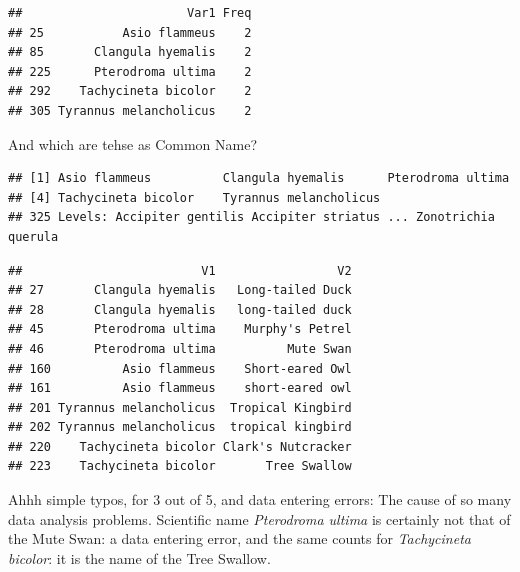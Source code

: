 \documentclass[]{book}
\newenvironment{Shaded}{\begin{snugshade}}{\end{snugshade}}
\newcommand{\DecValTok}[1]{\textcolor[rgb]{0.00,0.00,0.81}{#1}}
\newcommand{\NormalTok}[1]{#1}
\newcommand{\OperatorTok}[1]{\textcolor[rgb]{0.81,0.36,0.00}{\textbf{#1}}}
\newcommand{\StringTok}[1]{\textcolor[rgb]{0.31,0.60,0.02}{#1}}
\begin{document}
\begin{verbatim}
##                       Var1 Freq
## 25           Asio flammeus    2
## 85       Clangula hyemalis    2
## 225      Pterodroma ultima    2
## 292    Tachycineta bicolor    2
## 305 Tyrannus melancholicus    2
\end{verbatim}

And which are tehse as Common Name?

\begin{Shaded}
\end{Shaded}

\begin{verbatim}
## [1] Asio flammeus          Clangula hyemalis      Pterodroma ultima     
## [4] Tachycineta bicolor    Tyrannus melancholicus
## 325 Levels: Accipiter gentilis Accipiter striatus ... Zonotrichia querula
\end{verbatim}

\begin{Shaded}
\end{Shaded}

\begin{verbatim}
##                         V1                 V2
## 27       Clangula hyemalis   Long-tailed Duck
## 28       Clangula hyemalis   long-tailed duck
## 45       Pterodroma ultima    Murphy's Petrel
## 46       Pterodroma ultima          Mute Swan
## 160          Asio flammeus    Short-eared Owl
## 161          Asio flammeus    short-eared owl
## 201 Tyrannus melancholicus  Tropical Kingbird
## 202 Tyrannus melancholicus  tropical kingbird
## 220    Tachycineta bicolor Clark's Nutcracker
## 223    Tachycineta bicolor       Tree Swallow
\end{verbatim}

Ahhh simple typos, for 3 out of 5, and data entering errors: The cause of so many data analysis problems. Scientific name \emph{Pterodroma ultima} is certainly not that of the Mute Swan: a data entering error, and the same counts for \emph{Tachycineta bicolor}: it is the name of the Tree Swallow.
\end{document}
